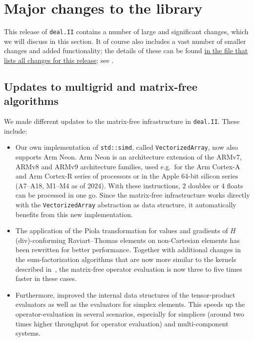 \documentclass{ansarticle-preprint}
\newcommand{\specialword}[1]{\texttt{#1}}
\newcommand{\dealii}{{\specialword{deal.II}}\xspace}
\begin{document}
\section{Major changes to the library}
\label{sec:major}

This release of \dealii contains a number of large and significant changes,
which we will discuss in this section.
It of course also includes a
vast number of smaller changes and added functionality; the details of these
can be found
\href{https://dealii.org/developer/doxygen/deal.II/changes_between_9_5_2_and_9_6_0.html}
{in the file that lists all changes for this release}; see \cite{changes96}.



\subsection{Updates to multigrid and matrix-free algorithms}\label{sec:mf}

  
We made different updates to the matrix-free infrastructure in \dealii. These include:
\begin{itemize}
\item Our own implementation of \texttt{std::simd}, called
  \texttt{VectorizedArray}, now also supports Arm Neon. Arm Neon is an
  architecture extension of the ARMv7, ARMv8 and ARMv9 architecture families,
  used e.g.~for the Arm Cortex-A and Arm Cortex-R series of processors or in
  the Apple 64-bit silicon series (A7--A18, M1--M4 as of 2024).
  With these instructions, 2 doubles or 4 floats can be processed in one
  go. Since the matrix-free infrastructure works directly with the \texttt{VectorizedArray}
  abstraction as data structure, it automatically benefits from this new implementation.
  
\item The application of the Piola transformation for values and gradients of
  $H$(div)-conforming Raviart--Thomas elements on non-Cartesian elements has
  been rewritten for better performance. Together with additional changes in
  the sum-factorization algorithms that are now more similar to the kernels
  described in~\cite{KronbichlerKormann2019}, the matrix-free operator
  evaluation is now three to five times faster in these cases.
  
\item Furthermore, improved the internal data structures of the tensor-product
  evaluators as well as the evaluators for simplex elements.  This speeds up
  the operator-evaluation in several scenarios, especially for simplices
  (around two times higher throughput for operator evaluation) and
  multi-component systems.
\end{itemize}
\end{document}
